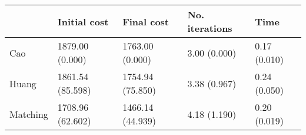 \begin{tabular}{lllll}
\toprule
{} &      Initial cost &        Final cost & No. iterations &          Time \\
\midrule
Cao      &   1879.00 (0.000) &   1763.00 (0.000) &   3.00 (0.000) &  0.17 (0.010) \\
Huang    &  1861.54 (85.598) &  1754.94 (75.850) &   3.38 (0.967) &  0.24 (0.050) \\
Matching &  1708.96 (62.602) &  1466.14 (44.939) &   4.18 (1.190) &  0.20 (0.019) \\
\bottomrule
\end{tabular}
